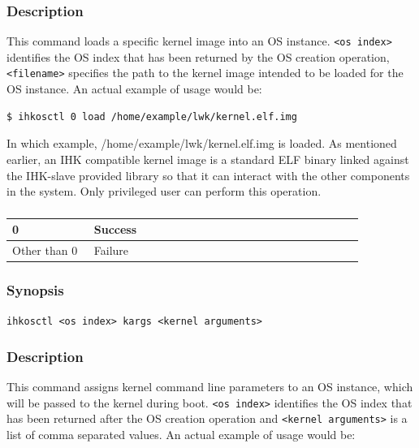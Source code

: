 \documentclass[twoside,11pt,fleqn]{book}
\begin{document}
\subsubsection*{Description}{\quad}
This command loads a specific kernel image into an OS instance.
\texttt{<os index>} identifies the OS index
that has been returned by the OS creation operation,
\texttt{<filename>} specifies the path to the kernel image intended to be
loaded for the OS instance.
An actual example of usage would be:

\begin{verbatim}
$ ihkosctl 0 load /home/example/lwk/kernel.elf.img
\end{verbatim}

In which example, /home/example/lwk/kernel.elf.img is loaded.
As mentioned earlier, an IHK compatible kernel image is a standard ELF
binary linked against the IHK-slave provided library so that it can interact
with the other components in the system.
Only privileged user can perform this operation.

\subsubsection*{}
\begin{table}[!h]
\footnotesize
\begin{tabular}{|p{0.20\linewidth}|p{0.66\linewidth}|} \hline
0&Success\\ \hline
Other than 0&Failure\\ \hline
\end{tabular}
\vspace{-0em}
\end{table}
\FloatBarrier

\subsubsection{}
\subsubsection*{Synopsis}{\quad} \texttt{ihkosctl <os index> kargs <kernel arguments>}
\subsubsection*{Description}{\quad}
This command assigns kernel command line parameters to an OS instance, which will be passed to the kernel during boot.
\texttt{<os index>} identifies the OS index
that has been returned after the OS creation operation and
\texttt{<kernel arguments>} is a list of comma separated values.
An actual example of usage would be:
\end{document}
